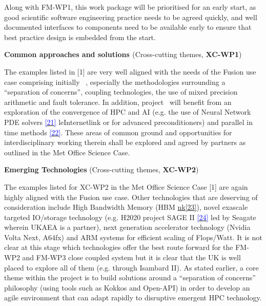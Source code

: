 \documentclass[a4paper]{article}
\newcommand\textstyleInternetlink[1]{\textcolor{blue}{#1}}
\begin{document}
\bigskip

Along with FM-WP1, this work package will be prioritised for an early start, as 
good scientific software engineering
practice needs to be agreed quickly, and well documented interfaces to 
components need to be available early to ensure
that best practice design is embedded from the start.


\bigskip

\textbf{\textcolor[rgb]{0.12156863,0.28627452,0.49019608}{Common approaches and 
solutions
}}\textcolor[rgb]{0.12156863,0.28627452,0.49019608}{(Cross-cutting themes,
}\textbf{\textcolor[rgb]{0.12156863,0.28627452,0.49019608}{XC-WP1}}\textcolor[rg
b]{0.12156863,0.28627452,0.49019608}{)}


\bigskip

{The examples listed in [1] are very well aligned with the needs of the Fusion 
use case comprising
initially \nep \ , especially the methodologies surrounding a ``separation of 
concerns'', coupling technologies, the
use of mixed precision arithmetic and fault tolerance. In addition, project 
\nep \  will benefit from an exploration of
the convergence of HPC and AI (e.g. the use of Neural Network PDE solvers
}\href{https://arxiv.org/abs/1906.01200}{\textstyleInternetlink{{[21]}}}\textsty
leInternetlink{{
or for advanced preconditioners}}{) and parallel in time methods
}\href{https://parallel-in-time.org/}{\textstyleInternetlink{{[22]}}}{. These 
areas
of common ground and opportunities for interdisciplinary working therein shall 
be explored and agreed by partners as
outlined in the Met Office Science Case.}


\bigskip

\textbf{\textcolor[rgb]{0.12156863,0.28627452,0.49019608}{Emerging
Technologies}}\textcolor[rgb]{0.12156863,0.28627452,0.49019608}{ (Cross-cutting 
themes,
}\textbf{\textcolor[rgb]{0.12156863,0.28627452,0.49019608}{XC-WP2}}\textcolor[rg
b]{0.12156863,0.28627452,0.49019608}{)}


\bigskip

{The examples listed for XC-WP2 in the Met Office Science Case [1] are again 
highly aligned with the
Fusion use case. Other technologies that are deserving of consideration include 
High Bandwidth Memory (HBM
}\href{https://en.wikipedia.org/wiki/High_Bandwidth_Memory}{\textstyleInternetli
nk{{[23]}}}{),
novel exascale targeted IO/storage }{technology (e.g. H2020 project SAGE II
}\href{http://sagestorage.eu/about/overview}{\textstyleInternetlink{{[24]}}}{ 
led by
Seagate wherein UKAEA is a partner), next generation accelerator technology 
(Nvidia Volta Next, A64fx) and ARM systems
for efficient scaling of Flops/Watt. It is not clear at this stage which 
technologies offer the best route forward for
the FM-WP2 and FM-WP3 close coupled system but it is clear that the UK is well 
placed to explore all of them (e.g.
through Isambard II). As stated earlier, a core theme within the project is to 
build solutions around a ``separation of
concerns'' philosophy (using tools such as Kokkos and Open-API) in order to 
develop an agile environment that can adapt
rapidly to disruptive emergent HPC technology.}
\end{document}
